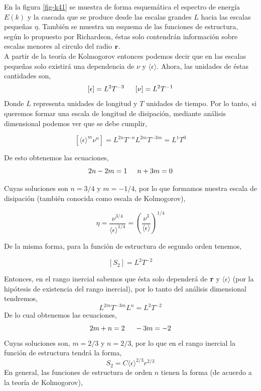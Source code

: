 \documentclass[executivepaper,12pt]{article}
\numberwithin{equation}{section}
\begin{document}
En la figura \ref{fig-k41} se muestra de forma esquemática el espectro de energía $E(k)$ y la cascada que se produce desde las escalas grandes $L$ hacia las escalas pequeñas $\eta$. También se muestra un esquema de las funciones de estructura, según lo propuesto por Richardson, éstas solo contendrán información sobre escalas menores al circulo del radio $\vb{r}$. \\
A partir de la teoría de Kolmogorov entonces podemos decir que en las escalas pequeñas solo existirá una dependencia de $\nu$ y $\langle \epsilon \rangle$. Ahora, las unidades de éstas cantidades son, 
\begin{equation*}
	\left[ \epsilon \right] = L^2 T^{-3} \hspace{0.5cm} \left[\nu\right]=L^2T^{-1}
\end{equation*} 
Donde $L$ representa unidades de longitud y $T$ unidades de tiempo. Por lo tanto, si queremos formar una escala de longitud de disipación, mediante análisis dimensional podemos ver que se debe cumplir,

\begin{equation*}
	\left[\langle \epsilon \rangle^m \nu^n \right]= L^{2n}T^{-n}L^{2m}T^{-3m}=L^1 T^0  
\end{equation*}

De esto obtenemos las ecuaciones,
\begin{equation*}
	2n-2m=1 \hspace{0.5cm} n+3m=0
\end{equation*}

Cuyas soluciones son $n=3/4$ y $m=-1/4$, por lo que formamos nuestra escala de disipación (también conocida como escala de Kolmogorov),
 

\begin{equation*}
\eta=\frac{\nu^{3/4}}{\langle \epsilon \rangle ^{1/4}}=\left(\frac{\nu^3}{\langle \epsilon \rangle}\right)^{1/4} 
\end{equation*}

De la misma forma, para la función de estructura de segundo orden tenemos, 

\begin{equation*}
	\left[S_2\right]=L^2 T^{-2}
\end{equation*}

Entonces, en el rango inercial sabemos que ésta solo dependerá de $\vb{r}$ y $\langle \epsilon \rangle$ (por la hipótesis de existencia del rango inercial), por lo tanto del análisis dimensional tendremos,
\begin{equation*}
	L^{2m} T^{-3m}L^{n}=L^2T^{-2}
\end{equation*} 
De lo cual obtenemos las ecuaciones,
\begin{equation*} 
	2m+n=2\hspace{0.5cm} -3m=-2
\end{equation*}
Cuyas soluciones son, $m=2/3$ y $n=2/3$, por lo que en el rango inercial la función de estructura tendrá la forma,
\begin{equation*}
	S_2=C\langle \epsilon \rangle^{2/3}r^{2/3}
\end{equation*}
En general, las funciones de estructura de orden $n$ tienen la forma (de acuerdo a la teoría de Kolmogorov),
\end{document}
